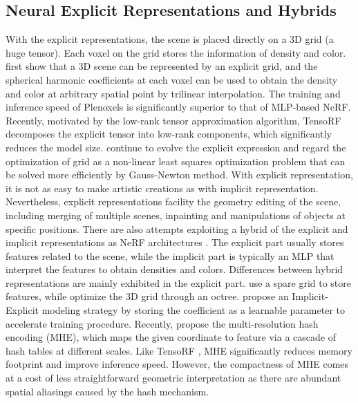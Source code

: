 \documentclass[letterpaper]{article} \usepackage{aaai23}  \usepackage{times}  \usepackage{helvet}  \usepackage{courier}  \usepackage[hyphens]{url}  \usepackage{graphicx} \urlstyle{rm} \def\UrlFont{\rm}  \usepackage{natbib}  \usepackage{caption} \frenchspacing  \setlength{\pdfpagewidth}{8.5in}  \setlength{\pdfpageheight}{11in}  \usepackage{multirow}
\begin{document}
\subsection{Neural Explicit Representations and Hybrids}
With the explicit representations, the scene is placed directly on a 3D grid (a huge tensor). Each voxel on the grid stores the information of density and color. \citeauthor{fridovich2022plenoxels} first show that a 3D scene can be represented by an explicit grid, and the spherical harmonic coefficients at each voxel can be used to obtain the density and color at arbitrary spatial point by trilinear interpolation. The training and inference speed of Plenoxels is significantly superior to that of MLP-based NeRF. Recently, motivated by the low-rank tensor approximation algorithm, TensoRF \cite{tang2022CCNeRF} decomposes the explicit tensor into low-rank components, which significantly reduces the model size. \citeauthor{rasmuson2022perf} continue to evolve the explicit expression and regard the optimization of grid as a non-linear least squares optimization problem that can be solved more efficiently by Gauss-Newton method. With explicit representation, it is not as easy to make artistic creations as with implicit representation. Nevertheless, explicit representations facility the geometry editing of the scene, including merging of multiple scenes, inpainting and manipulations of objects at specific positions.
There are also attempts exploiting a hybrid of the explicit and implicit representations as NeRF architectures \cite{usvyatsov2022t4dt,garbin2021fastNeRF,muller2022instant,chen2022tensorf,wu2022diver}.
The explicit part usually stores features related to the scene, while the implicit part is typically an MLP that interpret the features to obtain densities and colors. Differences between hybrid representations are mainly exhibited in the explicit part. \citeauthor{liu2020nsvf} use a spare grid to store features, while \citeauthor{yu2021plenoctrees} optimize the 3D grid through an octree. \citeauthor{wizadwongsa2021nex} propose an Implicit-Explicit modeling strategy by storing the coefficient as a learnable parameter to accelerate training procedure. Recently, \citeauthor{muller2022instant} propose the multi-resolution hash encoding (MHE), which maps the given coordinate to feature via a cascade of hash tables at different scales. Like TensoRF \cite{chen2022tensorf}, MHE significantly reduces memory footprint and improve inference speed. However, the compactness of MHE comes at a cost of less straightforward geometric interpretation as there are abundant spatial aliasings caused by the hash mechanism.
\end{document}
